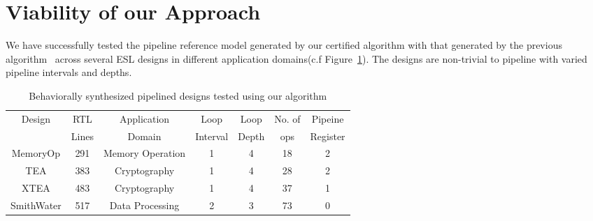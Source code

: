 \section{Viability of our Approach}
\label{sec:SEC}

We have successfully tested the pipeline reference model generated by our certified algorithm with that generated by the previous algorithm~\cite{kechengthesis} across several ESL designs in different application domains(c.f Figure~\ref{fig:testing}). The designs are non-trivial to pipeline with varied pipeline intervals and depths.

\begin{table}[h!]
  \centering
  \caption{Behaviorally synthesized pipelined designs tested using our algorithm}
  \label{fig:testing}
  \begin{tabular}{|c|c|c|c|c|c|c|}
    \hline
    Design & RTL & Application & Loop & Loop & No. of & Pipeine \\
               & Lines & Domain & Interval & Depth & ops & Register \\
    \hline
    MemoryOp & 291 & Memory Operation & 1 & 4 & 18 & 2 \\
    \hline
    TEA & 383 & Cryptography & 1 & 4 & 28 & 2 \\
    \hline
    XTEA & 483 & Cryptography & 1 & 4 & 37 & 1 \\
    \hline
    SmithWater & 517 & Data Processing & 2 & 3 & 73 & 0 \\
    \hline
    
  \end{tabular}
\end{table}








